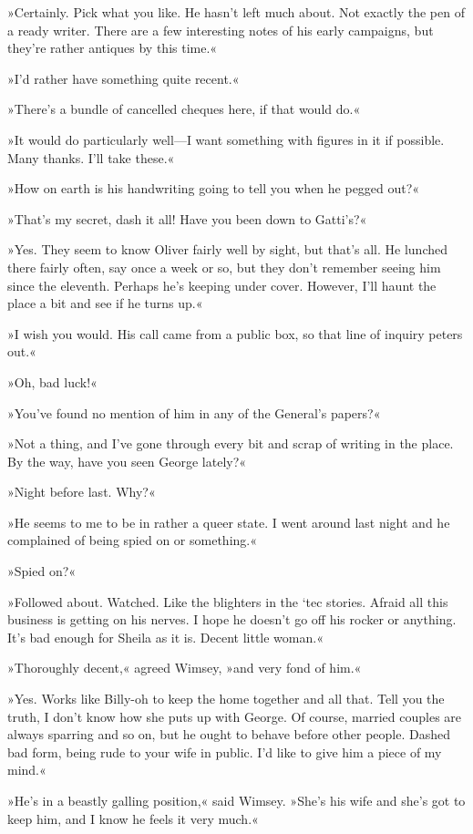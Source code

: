 »Certainly. Pick what you like. He hasn't left much about. Not exactly the pen of a ready writer. There are a few interesting notes of his early campaigns, but they're rather antiques by this time.«

»I'd rather have something quite recent.«

»There's a bundle of cancelled cheques here, if that would do.«

»It would do particularly well—I want something with figures in it if possible. Many thanks. I'll take these.«

»How on earth is his handwriting going to tell you when he pegged out?«

»That's my secret, dash it all! Have you been down to Gatti's?«

»Yes. They seem to know Oliver fairly well by sight, but that's all. He lunched there fairly often, say once a week or so, but they don't remember seeing him since the eleventh. Perhaps he's keeping under cover. However, I'll haunt the place a bit and see if he turns up.«

»I wish you would. His call came from a public box, so that line of inquiry peters out.«

»Oh, bad luck!«

»You've found no mention of him in any of the General's papers?«

»Not a thing, and I've gone through every bit and scrap of writing in the place. By the way, have you seen George lately?«

»Night before last. Why?«

»He seems to me to be in rather a queer state. I went around last night and he complained of being spied on or something.«

»Spied on?«

»Followed about. Watched. Like the blighters in the `tec stories. Afraid all this business is getting on his nerves. I hope he doesn't go off his rocker or anything. It's bad enough for Sheila as it is. Decent little woman.«

»Thoroughly decent,« agreed Wimsey, »and very fond of him.«

»Yes. Works like Billy-oh to keep the home together and all that. Tell you the truth, I don't know how she puts up with George. Of course, married couples are always sparring and so on, but he ought to behave before other people. Dashed bad form, being rude to your wife in public. I'd like to give him a piece of my mind.«

»He's in a beastly galling position,« said Wimsey. »She's his wife and she's got to keep him, and I know he feels it very much.«

